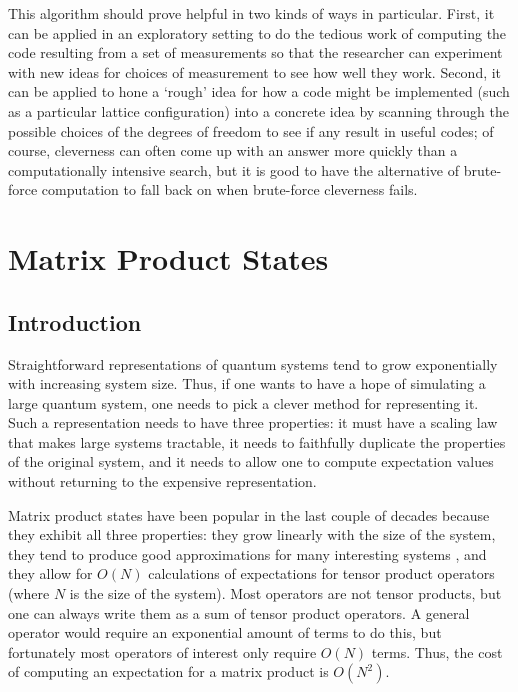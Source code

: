 \documentclass[12pt]{amsbook}
\theoremstyle{plain}
\theoremstyle{definition}
\theoremstyle{remark}
\begin{document}
This algorithm should prove helpful in two kinds of ways in particular.  First, it can be applied in an exploratory setting to do the tedious work of computing the code resulting from a set of measurements so that the researcher can experiment with new ideas for choices of measurement to see how well they work.  Second, it can be applied to hone a `rough' idea for how a code might be implemented (such as a particular lattice configuration) into a concrete idea by scanning through the possible choices of the degrees of freedom to see if any result in useful codes; of course, cleverness can often come up with an answer more quickly than a computationally intensive search, but it is good to have the alternative of brute-force computation to fall back on when brute-force cleverness fails.
\part{Matrix Product States}
\label{part:Matrix Product States}
\chapter{Introduction}

Straightforward representations of quantum systems tend to grow exponentially with increasing system size.  Thus, if one wants to have a hope of simulating a large quantum system, one needs to pick a clever method for representing it.  Such a representation needs to have three properties:  it must have a scaling law that makes large systems tractable, it needs to faithfully duplicate the properties of the original system, and it needs to allow one to compute expectation values without returning to the expensive representation.

Matrix product states \cite{Rommer:1997gf} \cite{Perotti:2005bh} \cite{cond-mat/0404706} \cite{cond-mat/0505140} \cite{Schollwock:2005ul} have been popular in the last couple of decades because they exhibit all three properties:  they grow linearly with the size of the system, they tend to produce good approximations for many interesting systems \cite{cond-mat/0505140}, and they allow for $O(N)$ calculations of expectations for tensor product operators (where $N$ is the size of the system).  Most operators are not tensor products, but one can always write them as a sum of tensor product operators.  A general operator would require an exponential amount of terms to do this, but fortunately most operators of interest only require $O(N)$ terms.  Thus, the cost of computing an expectation for a matrix product is $O(N^2)$.
\end{document}
